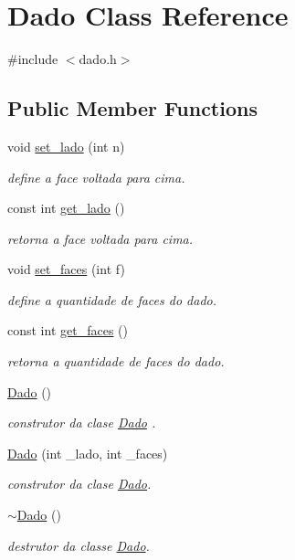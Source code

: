 \hypertarget{class_dado}{}\section{Dado Class Reference}
\label{class_dado}


{\ttfamily \#include $<$dado.\+h$>$}

\subsection*{Public Member Functions}
\begin{DoxyCompactItemize}
\item 
void \mbox{\hyperlink{class_dado_adf8e12bedf33b93809e0c990ab6face4}{set\+\_\+lado}} (int n)
\begin{DoxyCompactList}\small\item\em define a face voltada para cima. \end{DoxyCompactList}\item 
const int \mbox{\hyperlink{class_dado_ad1ecca7a73cc4a2b6d890eb276eeee5f}{get\+\_\+lado}} ()
\begin{DoxyCompactList}\small\item\em retorna a face voltada para cima. \end{DoxyCompactList}\item 
void \mbox{\hyperlink{class_dado_a4ee9814bfa3a645b86e8a865c41acc03}{set\+\_\+faces}} (int f)
\begin{DoxyCompactList}\small\item\em define a quantidade de faces do dado. \end{DoxyCompactList}\item 
const int \mbox{\hyperlink{class_dado_aaac9a6b7c544b9aa70021550b2d3e5cb}{get\+\_\+faces}} ()
\begin{DoxyCompactList}\small\item\em retorna a quantidade de faces do dado. \end{DoxyCompactList}\item 
\mbox{\hyperlink{class_dado_a4a541e4bd3b4d8a2bd5d58cfdcf0169a}{Dado}} ()
\begin{DoxyCompactList}\small\item\em construtor da clase \mbox{\hyperlink{class_dado}{Dado}} . \end{DoxyCompactList}\item 
\mbox{\hyperlink{class_dado_a3fc20e06674ec7c9ef1645aacfc89896}{Dado}} (int \+\_\+lado, int \+\_\+faces)
\begin{DoxyCompactList}\small\item\em construtor da clase \mbox{\hyperlink{class_dado}{Dado}}. \end{DoxyCompactList}\item 
\mbox{\hyperlink{class_dado_acecf4b980bab4db4ba446de3bc915205}{$\sim$\+Dado}} ()
\begin{DoxyCompactList}\small\item\em destrutor da classe \mbox{\hyperlink{class_dado}{Dado}}. \end{DoxyCompactList}\end{DoxyCompactItemize}


